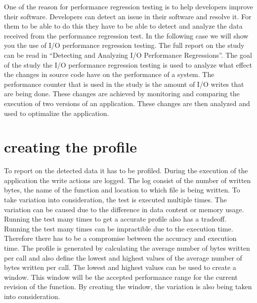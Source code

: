 \label{chapter:first}

One of the reason for performance regression testing is to help developers improve their software. Developers can detect an issue in their software and resolve it. For them to be able to do this they have to be able to detect and analyze the data received from the performance regression test. In the following case we will show you the use of I/O performance regression testing. The full report on the study can be read in ``Detecting and Analyzing I/O Performance Regressions''. \newline
The goal of the study the I/O performance regression testing is used to analyze what effect the changes in source code have on the performance of a system. The performance counter that is used in the study is the amount of I/O writes that are being done. These changes are achieved by monitoring and comparing the execution of two versions of an application. These changes are then analyzed and used to optimalize the application. \newline

\section*{creating the profile}
To report on the detected data it has to be profiled. During the execution of the application the write actions are logged. The log consist of the number of written bytes, the name of the function and location to which file is being written. To take variation into consideration, the test is executed multiple times. The variation can be caused due to the difference in data content or memory usage. Running the test many times to get a accurate profile also has a tradeoff. Running the test many times can be impractible due to the execution time. Therefore there has to be a compromise between the accuracy and execution time. \newline
The profile is generated by calculating the average number of bytes written per call and also define the lowest and highest values of the average number of bytes written per call. The lowest and highest values can be used to create a window. This window will be the accepted performance range for the current revision of the function. By creating the window, the variation is also being taken into consideration.

